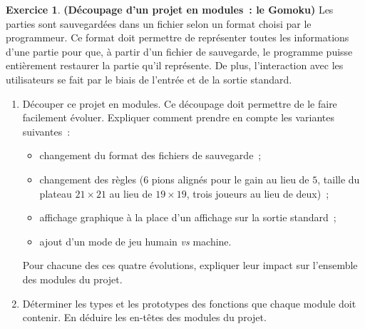 \documentclass[12pt]{article}
\theoremstyle{definition}
\newtheorem{Exercice}{Exercice}
\begin{document}
\begin{Exercice} {\bf (Découpage d'un projet en modules~: le Gomoku)}
Les parties sont sauvegardées dans un fichier selon un format choisi par
le programmeur. Ce format doit permettre de représenter toutes les
informations d'une partie pour que, à partir d'un fichier de sauvegarde,
le programme puisse entièrement restaurer la partie qu'il représente. De
plus, l'interaction avec les utilisateurs se fait par le biais de l'entrée
et de la sortie standard.
\medskip

\begin{enumerate}
    \item Découper ce projet en modules. Ce découpage doit permettre
    de le faire facilement évoluer. Expliquer comment prendre en compte
    les variantes suivantes~:
    \begin{itemize}
        \item changement du format des fichiers de sauvegarde~;
        \smallskip

        \item changement des règles ($6$ pions alignés pour le gain au
        lieu de $5$, taille du plateau $21 \times 21$ au lieu
        de $19 \times 19$, trois joueurs au lieu de deux)~;
        \smallskip

        \item affichage graphique à la place d'un affichage sur la sortie
        standard~;
        \smallskip

        \item ajout d'un mode de jeu humain {\em vs} machine.
    \end{itemize}
    Pour chacune des ces quatre évolutions, expliquer leur impact sur
    l'ensemble des modules du projet.
    \smallskip

    \item Déterminer les types et les prototypes des fonctions que chaque
    module doit contenir. En déduire les en-têtes des modules du projet.
\end{enumerate}
\end{Exercice}
\bigskip
\end{document}
